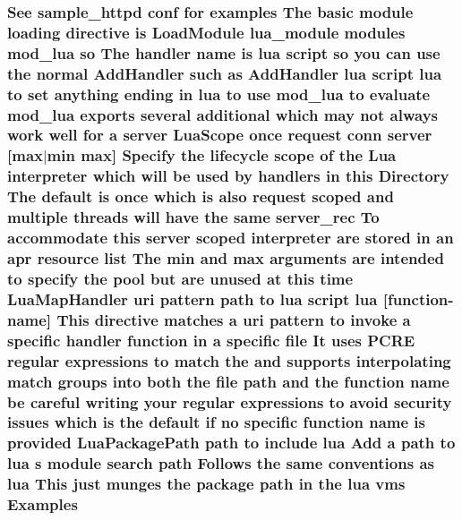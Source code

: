 \subsubsection[{\texorpdfstring{Examples}{Examples}}]{\setlength{\rightskip}{0pt plus 5cm}See sample\+\_\+httpd {\bf conf} for examples The basic {\bf module} loading {\bf directive} {\bf is} Load\+Module {\bf lua\+\_\+module} modules mod\+\_\+lua {\bf so} The {\bf handler} {\bf name} {\bf is} lua {\bf script} {\bf so} you {\bf can} use the normal Add\+Handler such {\bf as} Add\+Handler lua {\bf script} lua {\bf to} {\bf set} anything ending {\bf in} lua {\bf to} use mod\+\_\+lua {\bf to} evaluate mod\+\_\+lua exports several additional {\bf which} may {\bf not} always work well for {\bf a} {\bf server} Lua\+Scope {\bf once} {\bf request} {\bf conn} {\bf server} \mbox{[}{\bf max}$\vert${\bf min} {\bf max}\mbox{]} Specify the lifecycle scope {\bf of} the Lua interpreter {\bf which} will {\bf be} {\bf used} by handlers {\bf in} {\bf this} Directory The {\bf default} {\bf is} {\bf once} {\bf which} {\bf is} also {\bf request} scoped and multiple threads will have the same {\bf server\+\_\+rec} To accommodate {\bf this} {\bf server} scoped interpreter {\bf are} stored {\bf in} an apr {\bf resource} {\bf list} The {\bf min} and {\bf max} {\bf arguments} {\bf are} intended {\bf to} specify the {\bf pool} but {\bf are} unused at {\bf this} {\bf time} Lua\+Map\+Handler {\bf uri} {\bf pattern} {\bf path} {\bf to} lua {\bf script} lua \mbox{[}{\bf function}-\/{\bf name}\mbox{]} This {\bf directive} {\bf matches} {\bf a} {\bf uri} {\bf pattern} {\bf to} invoke {\bf a} specific {\bf handler} {\bf function} {\bf in} {\bf a} specific {\bf file} It uses {\bf P\+C\+RE} regular {\bf expressions} {\bf to} {\bf match} the and supports interpolating {\bf match} groups into both the {\bf file} {\bf path} and the {\bf function} {\bf name} {\bf be} careful writing your regular {\bf expressions} {\bf to} avoid security issues {\bf which} {\bf is} the {\bf default} {\bf if} no specific {\bf function} {\bf name} {\bf is} provided Lua\+Package\+Path {\bf path} {\bf to} {\bf include} lua Add {\bf a} {\bf path} {\bf to} lua {\bf s} {\bf module} search {\bf path} Follows the same conventions {\bf as} lua This just munges the package {\bf path} {\bf in} the lua vms Examples}\hypertarget{basic-configuration_8txt_aabaffd9e6ab07e022cdc7830519640e6}{}\label{basic-configuration_8txt_aabaffd9e6ab07e022cdc7830519640e6}
